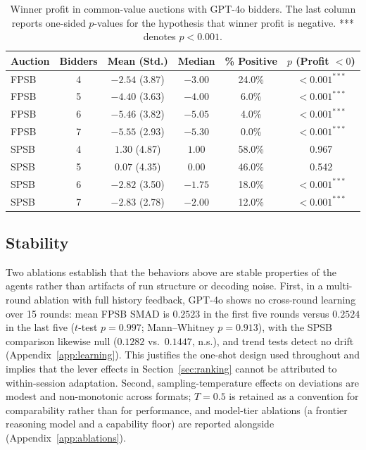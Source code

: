 \begin{table}[ht]
\centering
\begin{tabular}{lccccc}
\toprule
\textbf{Auction} & \textbf{Bidders} & \textbf{Mean (Std.)} & \textbf{Median} & \textbf{\% Positive} & \textbf{$p$ (Profit $<0$)} \\
\midrule
FPSB & 4 & $-2.54$ (3.87) & $-3.00$ & 24.0\% & $<0.001^{***}$ \\
FPSB & 5 & $-4.40$ (3.63) & $-4.00$ & 6.0\%  & $<0.001^{***}$ \\
FPSB & 6 & $-5.46$ (3.82) & $-5.05$ & 4.0\%  & $<0.001^{***}$ \\
FPSB & 7 & $-5.55$ (2.93) & $-5.30$ & 0.0\%  & $<0.001^{***}$ \\
\midrule
SPSB & 4 & $1.30$ (4.87)  & $1.00$  & 58.0\% & 0.967 \\
SPSB & 5 & $0.07$ (4.35)  & $0.00$  & 46.0\% & 0.542 \\
SPSB & 6 & $-2.82$ (3.50) & $-1.75$ & 18.0\% & $<0.001^{***}$ \\
SPSB & 7 & $-2.83$ (2.78) & $-2.00$ & 12.0\% & $<0.001^{***}$ \\
\bottomrule
\end{tabular}
\caption{Winner profit in common-value auctions with GPT-4o bidders. The last column reports one-sided $p$-values for the hypothesis that winner profit is negative. *** denotes $p < 0.001$.}
\label{tab:winners-curse}
\end{table}

\subsection{Stability}\label{sec:validation-stability}

Two ablations establish that the behaviors above are stable properties of the agents rather than artifacts of run structure or decoding noise. First, in a multi-round ablation with full history feedback, GPT-4o shows no cross-round learning over 15 rounds: mean FPSB SMAD is $0.2523$ in the first five rounds versus $0.2524$ in the last five ($t$-test $p = 0.997$; Mann--Whitney $p = 0.913$), with the SPSB comparison likewise null ($0.1282$ vs.\ $0.1447$, n.s.), and trend tests detect no drift (Appendix~\ref{app:learning}). This justifies the one-shot design used throughout and implies that the lever effects in Section~\ref{sec:ranking} cannot be attributed to within-session adaptation. Second, sampling-temperature effects on deviations are modest and non-monotonic across formats; $T=0.5$ is retained as a convention for comparability rather than for performance, and model-tier ablations (a frontier reasoning model and a capability floor) are reported alongside (Appendix~\ref{app:ablations}).

